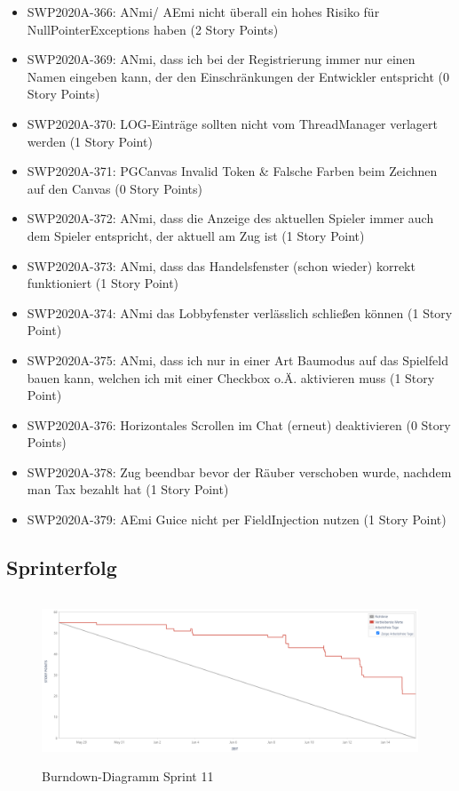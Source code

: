 \documentclass[12pt,a4paper, oneside]{article}
\begin{document}
\begin{itemize}
\item SWP2020A-366:	ANmi/ AEmi nicht überall ein hohes Risiko für NullPointerExceptions haben (2 Story Points)

\item SWP2020A-369: ANmi, dass ich bei der Registrierung immer nur einen Namen eingeben kann, der den Einschränkungen der Entwickler entspricht (0 Story Points)

\item SWP2020A-370:	LOG-Einträge sollten nicht vom ThreadManager verlagert werden (1 Story Point)

\item SWP2020A-371:	PGCanvas Invalid Token \& Falsche Farben beim Zeichnen auf den Canvas (0 Story Points)

\item SWP2020A-372:	ANmi, dass die Anzeige des aktuellen Spieler immer auch dem Spieler entspricht, der aktuell am Zug ist (1 Story Point)

\item SWP2020A-373:	ANmi, dass das Handelsfenster (schon wieder) korrekt funktioniert (1 Story Point)

\item SWP2020A-374:	ANmi das Lobbyfenster verlässlich schließen können (1 Story Point)

\item SWP2020A-375:	ANmi, dass ich nur in einer Art Baumodus auf das Spielfeld bauen kann, welchen ich mit einer Checkbox o.Ä. aktivieren muss (1 Story Point)

\item SWP2020A-376:	Horizontales Scrollen im Chat (erneut) deaktivieren (0 Story Points)

\item SWP2020A-378: Zug beendbar bevor der Räuber verschoben wurde, nachdem man Tax bezahlt hat (1 Story Point)

\item SWP2020A-379: AEmi Guice nicht per FieldInjection nutzen (1 Story Point)
\end{itemize}

\newpage

\subsection{Sprinterfolg}

\begin{figure}[h]
    \centering
   \includegraphics[width=\textwidth, height=5cm]{../img/sprint_11/Burndown-Sprint11.png}
    \caption{Burndown-Diagramm Sprint 11}
    \label{fig: Burndown-Sprint 11}
\end{figure}
\end{document}
